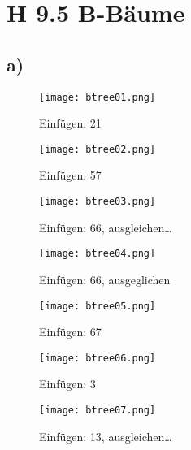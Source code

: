 \documentclass[a4paper]{article}
\begin{document}
\section*{H 9.5 B-Bäume}

\subsection*{a)}

\begin{figure}[!h]
	\begin{center}
		\texttt{[image: btree01.png]}
	\end{center}
	\caption{Einfügen: 21}
	\label{fig:btree01}
\end{figure}

\begin{figure}[!h]
	\begin{center}
		\texttt{[image: btree02.png]}
	\end{center}
	\caption{Einfügen: 57}
	\label{fig:btree02}
\end{figure}

\begin{figure}[!h]
	\begin{center}
		\texttt{[image: btree03.png]}
	\end{center}
	\caption{Einfügen: 66, ausgleichen\ldots}
	\label{fig:btree03}
\end{figure}

\begin{figure}[!h]
	\begin{center}
		\texttt{[image: btree04.png]}
	\end{center}
	\caption{Einfügen: 66, ausgeglichen}
	\label{fig:btree04}
\end{figure}

\begin{figure}[!h]
	\begin{center}
		\texttt{[image: btree05.png]}
	\end{center}
	\caption{Einfügen: 67}
	\label{fig:btree05}
\end{figure}

\begin{figure}[!h]
	\begin{center}
		\texttt{[image: btree06.png]}
	\end{center}
	\caption{Einfügen: 3}
	\label{fig:btree06}
\end{figure}

\begin{figure}[!h]
	\begin{center}
		\texttt{[image: btree07.png]}
	\end{center}
	\caption{Einfügen: 13, ausgleichen\ldots}
	\label{fig:btree07}
\end{figure}
\end{document}
